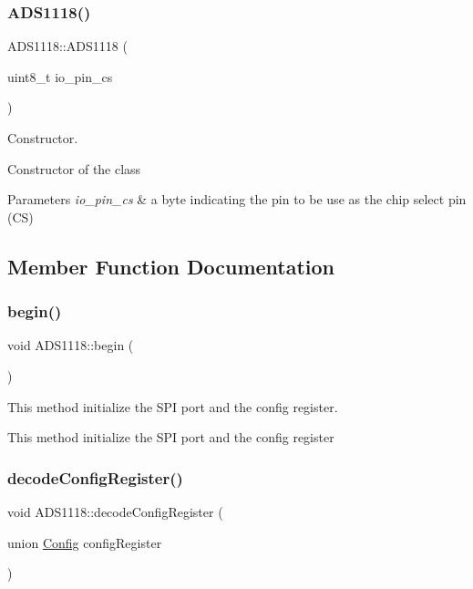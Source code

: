\subsubsection{\texorpdfstring{A\+D\+S1118()}{ADS1118()}}
{\footnotesize\ttfamily A\+D\+S1118\+::\+A\+D\+S1118 (\begin{DoxyParamCaption}\item[{uint8\+\_\+t}]{io\+\_\+pin\+\_\+cs }\end{DoxyParamCaption})}



Constructor. 

Constructor of the class 
\begin{DoxyParams}{Parameters}
{\em io\+\_\+pin\+\_\+cs} & a byte indicating the pin to be use as the chip select pin (CS) \\
\hline
\end{DoxyParams}


\subsection{Member Function Documentation}
\mbox{\label{class_a_d_s1118_a817f1a7619d97e19475458dc3eea5f88}} 
\subsubsection{\texorpdfstring{begin()}{begin()}}
{\footnotesize\ttfamily void A\+D\+S1118\+::begin (\begin{DoxyParamCaption}{ }\end{DoxyParamCaption})}



This method initialize the S\+PI port and the config register. 

This method initialize the S\+PI port and the config register \mbox{\label{class_a_d_s1118_a8d79b157a07574bd8745137a8347649e}} 
\subsubsection{\texorpdfstring{decode\+Config\+Register()}{decodeConfigRegister()}}
{\footnotesize\ttfamily void A\+D\+S1118\+::decode\+Config\+Register (\begin{DoxyParamCaption}\item[{union \mbox{\hyperlink{union_config}{Config}}}]{config\+Register }\end{DoxyParamCaption})}



